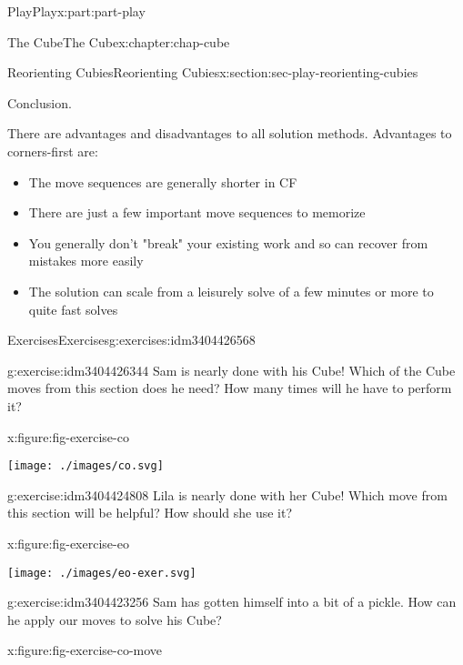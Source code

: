 \documentclass[oneside,10pt,]{book}
\numberwithin{equation}{section}
\begin{document}
\begin{partptx}{Play}{}{Play}{}{}{x:part:part-play}
\begin{chapterptx}{The Cube}{}{The Cube}{}{}{x:chapter:chap-cube}
\begin{sectionptx}{Reorienting Cubies}{}{Reorienting Cubies}{}{}{x:section:sec-play-reorienting-cubies}
\begin{conclusion}{Conclusion.}
\par
There are advantages and disadvantages to all solution methods. Advantages to corners-first are:%
\begin{itemize}[label=\textbullet]
\item{}The move sequences are generally shorter in CF%
\item{}There are just a few important move sequences to memorize%
\item{}You generally don't "break" your existing work and so can recover from mistakes more easily%
\item{}The solution can scale from a leisurely solve of a few minutes or more to quite fast solves%
\end{itemize}
%
\end{conclusion}%
%
%
\typeout{************************************************}
\typeout{************************************************}
%
\begin{exercises-subsection-numberless}{Exercises}{}{Exercises}{}{}{g:exercises:idm3404426568}
\begin{divisionexercise}{1}{}{}{g:exercise:idm3404426344}%
Sam is nearly done with his Cube! Which of the Cube moves from this section does he need? How many times will he have to perform it?%
\begin{figureptx}{}{x:figure:fig-exercise-co}{}%
\begin{image}{0.25}{0.5}{0.25}%
\texttt{[image: ./images/co.svg]}
\end{image}%
\tcblower
\end{figureptx}%
\end{divisionexercise}%
\begin{divisionexercise}{2}{}{}{g:exercise:idm3404424808}%
Lila is nearly done with her Cube! Which move from this section will be helpful? How should she use it?%
\begin{figureptx}{}{x:figure:fig-exercise-eo}{}%
\begin{image}{0.25}{0.5}{0.25}%
\texttt{[image: ./images/eo-exer.svg]}
\end{image}%
\tcblower
\end{figureptx}%
\end{divisionexercise}%
\begin{divisionexercise}{3}{}{}{g:exercise:idm3404423256}%
Sam has gotten himself into a bit of a pickle. How can he apply our moves to solve his Cube?%
\begin{figureptx}{}{x:figure:fig-exercise-co-move}{}%

\end{figureptx}
\end{divisionexercise}
\end{exercises-subsection-numberless}
\end{sectionptx}
\end{chapterptx}
\end{partptx}
\end{document}
